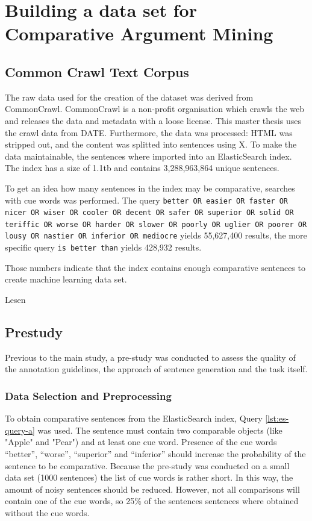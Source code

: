 \chapter{Building a data set for Comparative Argument Mining}
\section{Common Crawl Text Corpus}
The raw data used for the creation of the dataset was derived from CommonCrawl. CommonCrawl is a non-profit organisation which crawls the web and releases the data and metadata with a loose license. This master thesis uses the crawl data from DATE. Furthermore, the data was processed: HTML was stripped out, and the content was splitted into sentences using X. To make the data maintainable, the sentences where imported into an ElasticSearch index. The index has a size of 1.1tb and contains 3,288,963,864 unique sentences.

To get an idea how many sentences in the index may be comparative, searches with cue words was performed. The query \texttt{better OR easier OR faster OR nicer OR wiser OR cooler OR decent OR safer OR superior OR solid OR teriffic OR worse OR harder OR slower OR poorly OR uglier OR poorer OR lousy OR nastier OR inferior OR mediocre} yields 55,627,400 results, the more specific query \texttt{is better than} yields 428,932 results.

Those numbers indicate that the index contains enough comparative sentences to create machine learning data set.

Lesen \cite{Panchenko:2017aa}

\section{Prestudy}
Previous to the main study, a pre-study was conducted to assess the quality of the annotation guidelines, the approach of sentence generation and the task itself.


\subsection{Data Selection and Preprocessing}
\label{sec:prestudy-processing}
To obtain comparative sentences from the ElasticSearch index, Query \ref{lst:es-query-a} was used. The sentence must contain two comparable objects (like "Apple" and "Pear") and at least one cue word. Presence of the cue words \enquote{better}, \enquote{worse}, \enquote{superior} and \enquote{inferior} should increase the probability of the sentence to be comparative. Because the pre-study was conducted on a small data set (1000 sentences) the list of cue words is rather short. In this way, the amount of noisy sentences should be reduced.
However, not all comparisons will contain one of the cue words, so 25\% of the sentences sentences where obtained without the cue words.


